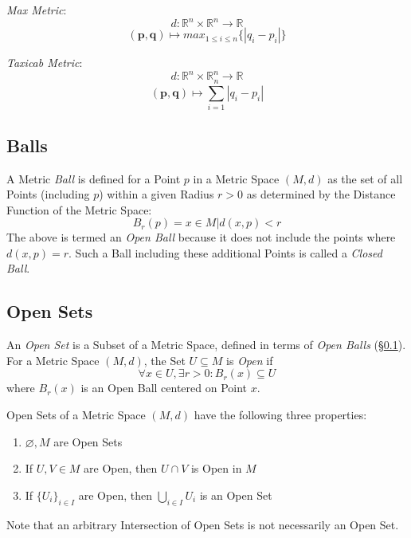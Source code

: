\documentclass{article}
\begin{document}
\emph{Max Metric}:
\[
    d: \mathbb{R}^n \times \mathbb{R}^n \rightarrow \mathbb{R}
\]\[
    (\mathbf{p},\mathbf{q}) \mapsto max_{1 \leq i \leq n}\{|q_i - p_i|\}
\]

\emph{Taxicab Metric}:
\[
    d: \mathbb{R}^n \times \mathbb{R}^n \rightarrow \mathbb{R}
\]\[
    (\mathbf{p},\mathbf{q}) \mapsto \sum_{i=1}^{n}|q_i - p_i|
\]

\subsection{Balls}\label{subsec:metric_balls}

A Metric \emph{Ball} is defined for a Point $p$ in a Metric Space
$(M,d)$ as the set of all Points (including $p$) within a given Radius
$r > 0$ as determined by the Distance Function of the Metric Space:
\[
    B_r(p) = {x \in M | d(x,p) < r }
\]
The above is termed an \emph{Open Ball} because it does not include
the points where $d(x,p) = r$. Such a Ball including these additional
Points is called a \emph{Closed Ball}.

\subsection{Open Sets}\label{subsec:open_sets}

An \emph{Open Set} is a Subset of a Metric Space, defined in terms of
\emph{Open Balls} (\S\ref{subsec:metric_balls}). For a Metric Space
$(M,d)$, the Set $U \subseteq M$ is \emph{Open} if
\[
    \forall x \in U, \exists r > 0 : B_r(x) \subseteq U
\]
where $B_r(x)$ is an Open Ball centered on Point $x$.

Open Sets of a Metric Space $(M,d)$ have the following three
properties:
\begin{enumerate}
\item $\varnothing, M$ are Open Sets
\item If $U, V \in M$ are Open, then $U \cap V$ is Open in $M$
\item If $\{ U_i \}_{i \in I}$ are Open, then $\bigcup_{i \in I}
  U_i$ is an Open Set
\end{enumerate}
Note that an arbitrary Intersection of Open Sets is not necessarily an
Open Set.
\end{document}
